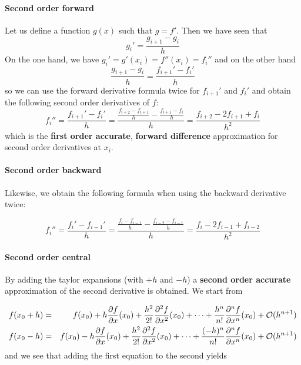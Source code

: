 \paragraph{Second order forward} 
Let us define a function $g(x)$ such that $g=f'$. Then we have seen that  
\[
g_i' = \frac{g_{i+1}-g_{i}}{h}
\]
On the one hand, we have $g_i'=g'(x_i)=f''(x_i)=f_i''$ and on the other hand
\[
\frac{g_{i+1}-g_{i}}{h} = \frac{f_{i+1}'-f_{i}'}{h}
\]
so we can use the forward derivative formula twice for $f_{i+1}'$ and $f_{i}'$ and 
obtain the following second order derivatives of $f$:
\[
f_{i}'' 
= \frac{f_{i+1}'-f_i'}{h} 
= \frac{\frac{f_{i+2}-f_{i+1}}{h}-
\frac{f_{i+1}-f_i}{h}
}{h} 
= \frac{f_{i+2}-2f_{i+1}+f_i}{h^2} 
\]
which is the {\bf first order accurate}, {\bf forward difference} approximation for
second order derivatives at $x_{i}$.

\paragraph{Second order backward}
Likewise, we obtain the following formula when using the backward derivative twice:

\[
f_{i}'' 
= \frac{f_{i}'-f_{i-1}'}{h} 
= \frac{\frac{f_{i}-f_{i-1}}{h}- \frac{f_{i-2}-f_{i-1}}{h}  }{h} 
= \frac{f_{i}-2f_{i-1}+f_{i-2}}{h^2} 
\]





\paragraph{Second order central} 
By adding the taylor expansions (with $+h$ and $-h$) 
a {\bf second order accurate}  approximation of the second derivative is obtained.
We start from 

\begin{eqnarray}
f(x_0+h)&=&f(x_0)+ 
h \frac{\partial f}{\partial x}(x_0)  + 
\frac{h^2}{2!} \frac{\partial^2 f}{\partial x^2}(x_0)  +
\dots  +
\frac{h^n}{n!} \frac{\partial^n f}{\partial x^n}(x_0)  
+ {\cal O}(h^{n+1}) \nonumber
\\
f(x_0-h)&=&f(x_0) 
-h \frac{\partial f}{\partial x}(x_0)  + 
\frac{h^2}{2!} \frac{\partial^2 f}{\partial x^2}(x_0)  +
\dots  +
\frac{(-h)^n}{n!} \frac{\partial^n f}{\partial x^n}(x_0)  
+ {\cal O}(h^{n+1})
\end{eqnarray}
and we see that adding the first equation to the second yields

